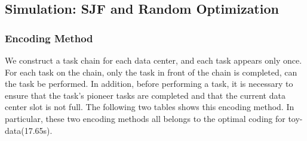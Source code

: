 \documentclass{llncs}
\begin{document}
\subsection{Simulation: SJF and Random Optimization}

\subsubsection{Encoding Method}
We construct a task chain for each data center, and each task appears only once. For each task on the chain, only the task in front of the chain is completed, can the task be performed. In addition, before performing a task, it is necessary to ensure that the task's pioneer tasks are completed and that the current data center slot is not full. The following two tables shows this encoding method. In particular, these two encoding methods all belongs to the optimal coding for toy-data(17.65s).
\end{document}
